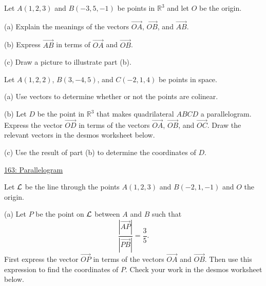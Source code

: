 \documentclass{ximera}
\begin{document}
\begin{question}  \label{Q:dsfr4rtgt4r}
Let $A(1,2,3)$ and $B(-3,5,-1)$ be points in $\mathbb{R}^3$ and let $O$ be the origin.

(a) Explain the meanings of the vectors $\overrightarrow{OA}$, $\overrightarrow{OB}$, and $\overrightarrow{AB}$.

(b) Express $\overrightarrow{AB}$ in terms of $\overrightarrow{OA}$ and $\overrightarrow{OB}$.

(c) Draw a picture to illustrate part (b).
\end{question}


\begin{question}  \label{Q:df945r435r34}
Let $A(1,2,2)$, $B(3,-4,5)$, and $C(-2,1,4)$ be points in space.

(a) Use vectors to determine whether or not the points are colinear.

(b) Let $D$ be the point in $\mathbb{R}^3$ that makes quadrilateral $ABCD$ a parallelogram. Express the vector $\overrightarrow{OD}$ in terms of the vectors $\overrightarrow{OA}$, $\overrightarrow{OB}$, and $\overrightarrow{OC}$. Draw the relevant vectors in the desmos worksheet below.

(c) Use the result of part (b) to determine the coordinates of $D$.

\begin{onlineOnly}
    \begin{center}
\end{center}
\end{onlineOnly}

\href{https://www.desmos.com/3d/qsww6nlulm}{163: Parallelogram}
\end{question}


\begin{question} \label{Q98344422}
Let ${\cal L}$ be the line through the points $A(1,2,3)$ and $B(-2,1,-1)$ and $O$ the origin.

(a) Let $P$ be the point on ${\cal L}$ between $A$ and $B$ such that
\[
      \frac{|\overrightarrow{AP}|}{|\overrightarrow{PB}|} = \frac{3}{5} . 
\]
First express the vector $\overrightarrow{OP}$ in terms of the vectors $\overrightarrow{OA}$ and $\overrightarrow{OB}$. Then use this expression to find the coordinates of $P$. Check your work in the desmos worksheet below.




\end{question}
\end{document}
